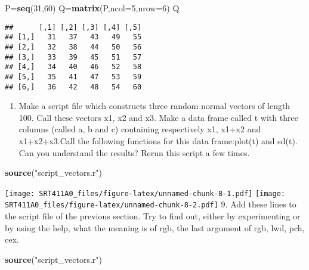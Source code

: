 \documentclass[]{article}
\newenvironment{Shaded}{\begin{snugshade}}{\end{snugshade}}
\newcommand{\KeywordTok}[1]{\textcolor[rgb]{0.13,0.29,0.53}{\textbf{#1}}}
\newcommand{\DataTypeTok}[1]{\textcolor[rgb]{0.13,0.29,0.53}{#1}}
\newcommand{\DecValTok}[1]{\textcolor[rgb]{0.00,0.00,0.81}{#1}}
\newcommand{\StringTok}[1]{\textcolor[rgb]{0.31,0.60,0.02}{#1}}
\newcommand{\NormalTok}[1]{#1}
\providecommand{\tightlist}{%
  \setlength{\itemsep}{0pt}\setlength{\parskip}{0pt}}
\begin{document}
\begin{Shaded}
\begin{Highlighting}[]
\NormalTok{P=}\KeywordTok{seq}\NormalTok{(}\DecValTok{31}\NormalTok{,}\DecValTok{60}\NormalTok{)}
\NormalTok{Q=}\KeywordTok{matrix}\NormalTok{(P,}\DataTypeTok{ncol=}\DecValTok{5}\NormalTok{,}\DataTypeTok{nrow=}\DecValTok{6}\NormalTok{)}
\NormalTok{Q}
\end{Highlighting}
\end{Shaded}

\begin{verbatim}
##      [,1] [,2] [,3] [,4] [,5]
## [1,]   31   37   43   49   55
## [2,]   32   38   44   50   56
## [3,]   33   39   45   51   57
## [4,]   34   40   46   52   58
## [5,]   35   41   47   53   59
## [6,]   36   42   48   54   60
\end{verbatim}

\begin{enumerate}
\def\labelenumi{\arabic{enumi}.}
\setcounter{enumi}{7}
\tightlist
\item
  Make a script file which constructs three random normal vectors of
  length 100. Call these vectors x1, x2 and x3. Make a data frame called
  t with three columns (called a, b and c) containing respectively x1,
  x1+x2 and x1+x2+x3.Call the following functions for this data
  frame:plot(t) and sd(t). Can you understand the results? Rerun this
  script a few times.
\end{enumerate}

\begin{Shaded}
\begin{Highlighting}[]
\KeywordTok{source}\NormalTok{(}\StringTok{"script_vectors.r"}\NormalTok{)}
\end{Highlighting}
\end{Shaded}

\texttt{[image: SRT411A0\_files/figure-latex/unnamed-chunk-8-1.pdf]}
\texttt{[image: SRT411A0\_files/figure-latex/unnamed-chunk-8-2.pdf]} 9.
Add these lines to the script file of the previous section. Try to find
out, either by experimenting or by using the help, what the meaning is
of rgb, the last argument of rgb, lwd, pch, cex.

\begin{Shaded}
\begin{Highlighting}[]
\KeywordTok{source}\NormalTok{(}\StringTok{"script_vectors.r"}\NormalTok{)}
\end{Highlighting}
\end{Shaded}
\end{document}
